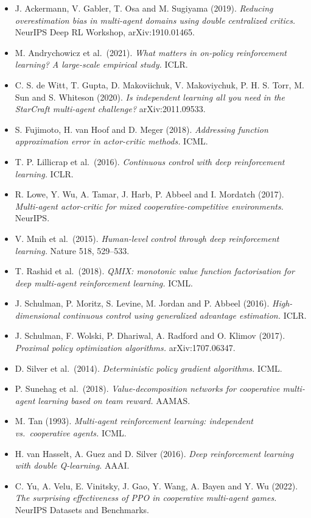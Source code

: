 \begin{itemize}[leftmargin=1.5em,itemindent=-1.5em,label={}]
  \item J. Ackermann, V. Gabler, T. Osa and M. Sugiyama (2019).
    \emph{Reducing overestimation bias in multi-agent domains using double
    centralized critics.} NeurIPS Deep RL Workshop, arXiv:1910.01465.
  \item M. Andrychowicz et al.\ (2021). \emph{What matters in on-policy
    reinforcement learning? A large-scale empirical study.} ICLR.
  \item C. S. de Witt, T. Gupta, D. Makoviichuk, V. Makoviychuk,
    P. H. S. Torr, M. Sun and S. Whiteson (2020). \emph{Is independent
    learning all you need in the StarCraft multi-agent challenge?}
    arXiv:2011.09533.
  \item S. Fujimoto, H. van Hoof and D. Meger (2018). \emph{Addressing
    function approximation error in actor-critic methods.} ICML.
  \item T. P. Lillicrap et al.\ (2016). \emph{Continuous control with deep
    reinforcement learning.} ICLR.
  \item R. Lowe, Y. Wu, A. Tamar, J. Harb, P. Abbeel and I. Mordatch (2017).
    \emph{Multi-agent actor-critic for mixed cooperative-competitive
    environments.} NeurIPS.
  \item V. Mnih et al.\ (2015). \emph{Human-level control through deep
    reinforcement learning.} Nature 518, 529--533.
  \item T. Rashid et al.\ (2018). \emph{QMIX: monotonic value function
    factorisation for deep multi-agent reinforcement learning.} ICML.
  \item J. Schulman, P. Moritz, S. Levine, M. Jordan and P. Abbeel (2016).
    \emph{High-dimensional continuous control using generalized advantage
    estimation.} ICLR.
  \item J. Schulman, F. Wolski, P. Dhariwal, A. Radford and O. Klimov (2017).
    \emph{Proximal policy optimization algorithms.} arXiv:1707.06347.
  \item D. Silver et al.\ (2014). \emph{Deterministic policy gradient
    algorithms.} ICML.
  \item P. Sunehag et al.\ (2018). \emph{Value-decomposition networks for
    cooperative multi-agent learning based on team reward.} AAMAS.
  \item M. Tan (1993). \emph{Multi-agent reinforcement learning: independent
    vs.\ cooperative agents.} ICML.
  \item H. van Hasselt, A. Guez and D. Silver (2016). \emph{Deep
    reinforcement learning with double Q-learning.} AAAI.
  \item C. Yu, A. Velu, E. Vinitsky, J. Gao, Y. Wang, A. Bayen and Y. Wu
    (2022). \emph{The surprising effectiveness of PPO in cooperative
    multi-agent games.} NeurIPS Datasets and Benchmarks.
\end{itemize}

\endgroup
